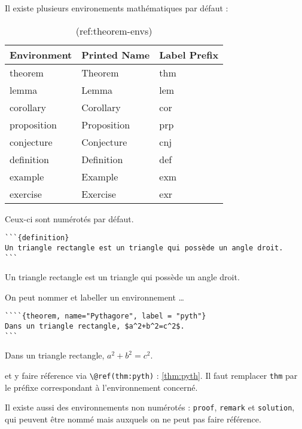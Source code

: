 \documentclass[]{book}
\theoremstyle{definition}
\theoremstyle{definition}
\theoremstyle{definition}
\theoremstyle{remark}
\let\BeginKnitrBlock\begin \let\EndKnitrBlock\end
\begin{document}
Il existe plusieurs environements mathématiques par défaut :

\begin{table}[t]

\caption{\label{tab:theorem-envs}(ref:theorem-envs)}
\centering
\begin{tabular}{lll}
\toprule
Environment & Printed Name & Label Prefix\\
\midrule
theorem & Theorem & thm\\
lemma & Lemma & lem\\
corollary & Corollary & cor\\
proposition & Proposition & prp\\
conjecture & Conjecture & cnj\\
\addlinespace
definition & Definition & def\\
example & Example & exm\\
exercise & Exercise & exr\\
\bottomrule
\end{tabular}
\end{table}

Ceux-ci sont numérotés par défaut.

\begin{verbatim}
```{definition}
Un triangle rectangle est un triangle qui possède un angle droit.
```
\end{verbatim}

\BeginKnitrBlock{definition}
\protect\hypertarget{def:unnamed-chunk-2}{}{\label{def:unnamed-chunk-2} }Un triangle rectangle est un triangle qui possède un angle droit.
\EndKnitrBlock{definition}

On peut nommer et labeller un environnement \ldots{}

\begin{verbatim}
````{theorem, name="Pythagore", label = "pyth"}
Dans un triangle rectangle, $a^2+b^2=c^2$.
```
\end{verbatim}

\BeginKnitrBlock{theorem}[Pythagore]
\protect\hypertarget{thm:pyth}{}{\label{thm:pyth} \iffalse (Pythagore) \fi{} }Dans un triangle rectangle, \(a^2+b^2=c^2\).
\EndKnitrBlock{theorem}

et y faire réference via \texttt{\textbackslash{}@ref(thm:pyth)} : \ref{thm:pyth}. Il faut remplacer \texttt{thm} par le préfixe correspondant à l'environnement concerné.

Il existe aussi des environnements non numérotés : \texttt{proof}, \texttt{remark} et \texttt{solution}, qui peuvent être nommé mais auxquels on ne peut pas faire référence.
\end{document}
